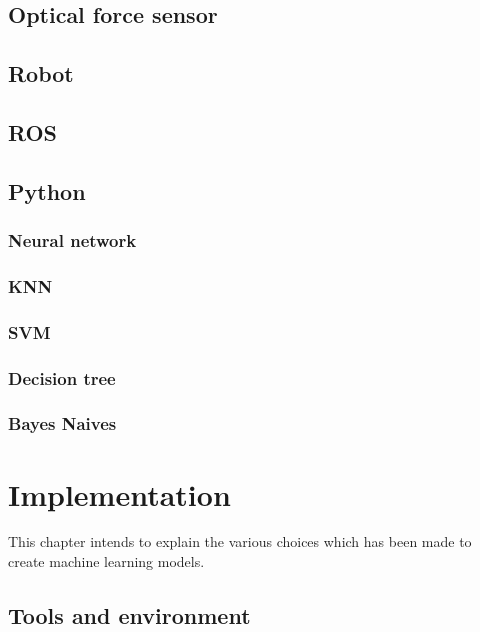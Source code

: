 \documentclass[USenglish]{ifimaster}  %
\begin{document}
\section{Optical force sensor}

\section{Robot}
	
\section{ROS}

\section{Python}


\subsection{Neural network}

\subsection{KNN}

\subsection{SVM}

\subsection{Decision tree}

\subsection{Bayes Naives}

\chapter{Implementation}\label{ch:implementation}        %
This chapter intends to explain the various choices which has been made to create machine learning models.
	
\section{Tools and environment}
	
\end{document}
